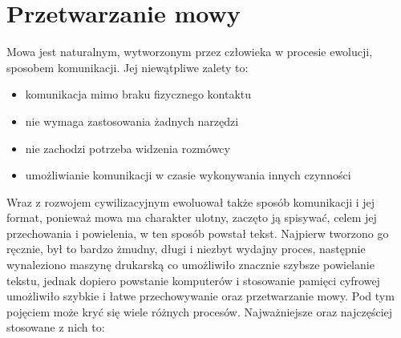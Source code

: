 \section{Przetwarzanie mowy}
Mowa jest naturalnym, wytworzonym przez człowieka w procesie ewolucji, sposobem komunikacji. Jej niewątpliwe zalety to:
\begin{itemize}
	\item komunikacja mimo braku fizycznego kontaktu
	\item nie wymaga zastosowania żadnych narzędzi
	\item nie zachodzi potrzeba widzenia rozmówcy
	\item umożliwianie komunikacji w czasie wykonywania innych czynności
\end{itemize}
Wraz z rozwojem cywilizacyjnym ewoluował także sposób komunikacji i jej format, ponieważ mowa ma charakter ulotny, zaczęto ją spisywać, celem jej przechowania i powielenia, w ten sposób powstał tekst. Najpierw tworzono go ręcznie, był to bardzo żmudny, długi i niezbyt wydajny proces, następnie wynaleziono maszynę drukarską co umożliwiło znacznie szybsze powielanie tekstu, jednak dopiero powstanie komputerów i stosowanie pamięci cyfrowej umożliwiło szybkie i łatwe przechowywanie oraz przetwarzanie mowy. Pod tym pojęciem może kryć się wiele różnych procesów. Najważniejsze oraz najczęściej stosowane z nich to:
